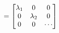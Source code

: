 \documentclass[preview]{standalone}
\begin{document}
\begin{align*}
\special{dvisvgm:raw <g id='unique000'>}= \begin{bmatrix} \lambda_1 & 0 & 0 \\ 0 & \lambda_2 & 0 \\ 0 & 0 & \cdots \end{bmatrix}\special{dvisvgm:raw </g>}
\end{align*}
\end{document}

